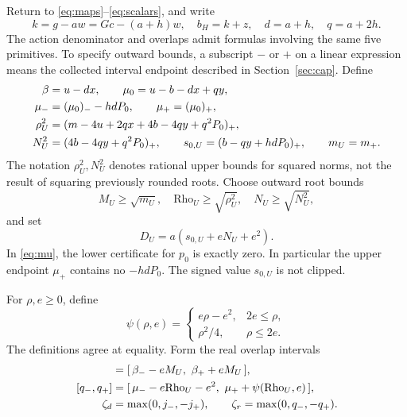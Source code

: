 \documentclass[11pt,a4paper]{article}
\theoremstyle{definition}
\theoremstyle{remark}
\numberwithin{equation}{section}
\begin{document}
Return to \eqref{eq:maps}--\eqref{eq:scalars}, and write
\[
 k=g-aw=Gc-(a+h)w,\quad b_H=k+z,\quad
 d=a+h,\quad q=a+2h.
\]
The action denominator and overlaps admit formulas involving the same
five primitives. To specify outward bounds, a subscript $-$ or $+$
on a linear expression means the collected interval endpoint described
in Section~\ref{sec:cap}. Define
\begin{align}
 \beta&=u-dx,\qquad \mu_0=u-b-dx+qy,\notag\\
 \mu_-&=(\mu_0)_--hdP_0,\qquad
 \mu_+=(\mu_0)_+,                                      \label{eq:mu}\\
 \rho_U^2&=(m-4u+2qx+4b-4qy+q^2P_0)_+,\notag\\
 N_U^2&=(4b-4qy+q^2P_0)_+,\qquad
 s_{0,U}=(b-qy+hdP_0)_+,\qquad m_U=m_+ .               \label{eq:normlifts}
\end{align}
The notation $\rho_U^2,N_U^2$ denotes rational upper bounds for squared
norms, not the result of squaring previously rounded roots.
Choose outward root bounds
\[
 M_U\ge\sqrt{m_U},\quad
 \mathrm{Rho}_U\ge\sqrt{\rho_U^2},\quad
 N_U\ge\sqrt{N_U^2},
\]
and set
\begin{equation}\label{eq:DU}
 D_U=a(s_{0,U}+eN_U+e^2).
\end{equation}
In \eqref{eq:mu}, the lower certificate for $p_0$ is exactly zero.
In particular the upper endpoint $\mu_+$ contains no $-hdP_0$.
The signed value $s_{0,U}$ is not clipped.

For $\rho,e\ge0$, define
\begin{equation}\label{eq:psi}
 \psi(\rho,e)=
 \begin{cases}
  e\rho-e^2,&2e\le\rho,\\
  \rho^2/4,&\rho\le2e.
 \end{cases}
\end{equation}
The definitions agree at equality. Form the real overlap intervals
\begin{align}
 [j_-,j_+]&=[\,\beta_- -eM_U,\ \beta_+ +eM_U\,],\notag\\
 [q_-,q_+]&=[\,\mu_- -e\mathrm{Rho}_U-e^2,\
                    \mu_+ +\psi(\mathrm{Rho}_U,e)\,],     \label{eq:overlaps}\\
 \zeta_d&=\max(0,j_-,-j_+),\qquad
 \zeta_r=\max(0,q_-,-q_+). \notag
\end{align}
\end{document}
